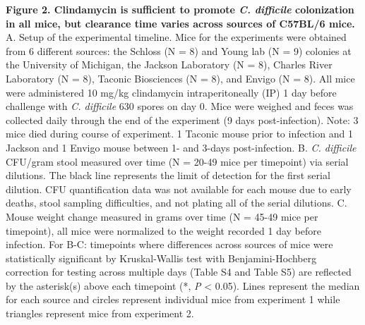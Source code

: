 \documentclass[11pt,]{article}
\begin{document}
\textbf{Figure 2. Clindamycin is sufficient to promote \emph{C.
difficile} colonization in all mice, but clearance time varies across
sources of C57BL/6 mice.} A. Setup of the experimental timeline. Mice
for the experiments were obtained from 6 different sources: the Schloss
(N = 8) and Young lab (N = 9) colonies at the University of Michigan,
the Jackson Laboratory (N = 8), Charles River Laboratory (N = 8),
Taconic Biosciences (N = 8), and Envigo (N = 8). All mice were
administered 10 mg/kg clindamycin intraperitoneally (IP) 1 day before
challenge with \emph{C. difficile} 630 spores on day 0. Mice were
weighed and feces was collected daily through the end of the experiment
(9 days post-infection). Note: 3 mice died during course of experiment.
1 Taconic mouse prior to infection and 1 Jackson and 1 Envigo mouse
between 1- and 3-days post-infection. B. \emph{C. difficile} CFU/gram
stool measured over time (N = 20-49 mice per timepoint) via serial
dilutions. The black line represents the limit of detection for the
first serial dilution. CFU quantification data was not available for
each mouse due to early deaths, stool sampling difficulties, and not
plating all of the serial dilutions. C. Mouse weight change measured in
grams over time (N = 45-49 mice per timepoint), all mice were normalized
to the weight recorded 1 day before infection. For B-C: timepoints where
differences across sources of mice were statistically significant by
Kruskal-Wallis test with Benjamini-Hochberg correction for testing
across multiple days (Table S4 and Table S5) are reflected by the
asterisk(s) above each timepoint (*, \emph{P} \textless{} 0.05). Lines
represent the median for each source and circles represent individual
mice from experiment 1 while triangles represent mice from experiment 2.

\newpage
\end{document}

